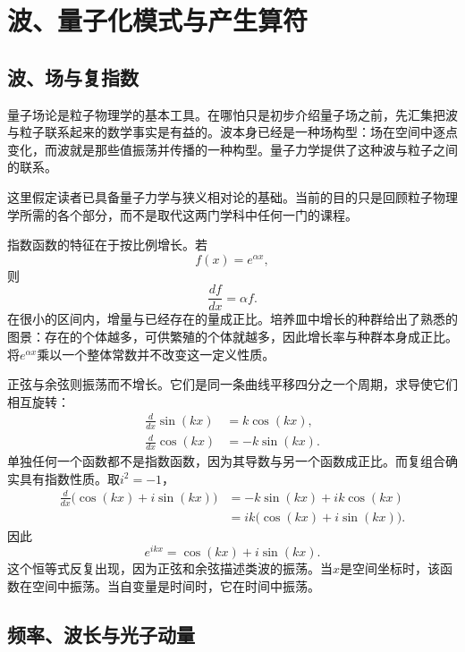 \chapter{波、量子化模式与产生算符}

\section{波、场与复指数}

量子场论是粒子物理学的基本工具。在哪怕只是初步介绍量子场之前，先汇集把波与粒子联系起来的数学事实是有益的。波本身已经是一种场构型：场在空间中逐点变化，而波就是那些值振荡并传播的一种构型。量子力学提供了这种波与粒子之间的联系。

这里假定读者已具备量子力学与狭义相对论的基础。当前的目的只是回顾粒子物理学所需的各个部分，而不是取代这两门学科中任何一门的课程。

指数函数的特征在于按比例增长。若
\begin{equation}
f(x)=e^{\alpha x},
\end{equation}
则
\begin{equation}
\frac{df}{dx}=\alpha f.
\end{equation}
在很小的区间内，增量与已经存在的量成正比。培养皿中增长的种群给出了熟悉的图景：存在的个体越多，可供繁殖的个体就越多，因此增长率与种群本身成正比。将\(e^{\alpha x}\)乘以一个整体常数并不改变这一定义性质。

正弦与余弦则振荡而不增长。它们是同一条曲线平移四分之一个周期，求导使它们相互旋转：
\begin{align}
\frac{d}{dx}\sin(kx)&=k\cos(kx),\\
\frac{d}{dx}\cos(kx)&=-k\sin(kx).
\end{align}
单独任何一个函数都不是指数函数，因为其导数与另一个函数成正比。而复组合确实具有指数性质。取\(i^2=-1\)，
\begin{align}
\frac{d}{dx}\bigl(\cos(kx)+i\sin(kx)\bigr)
&=-k\sin(kx)+ik\cos(kx)\\
&=ik\bigl(\cos(kx)+i\sin(kx)\bigr).
\end{align}
因此
\begin{equation}
e^{ikx}=\cos(kx)+i\sin(kx).
\end{equation}
这个恒等式反复出现，因为正弦和余弦描述类波的振荡。当\(x\)是空间坐标时，该函数在空间中振荡。当自变量是时间时，它在时间中振荡。

\section{频率、波长与光子动量}

